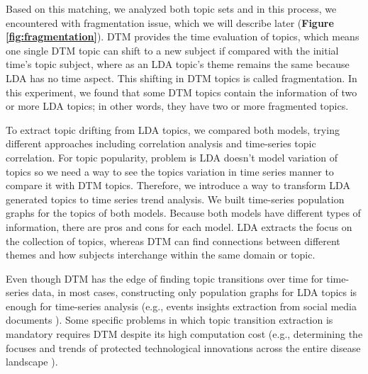 Based on this matching, we analyzed both topic sets and in this process, we encountered with fragmentation issue, which we will describe later (\textbf{Figure \ref{fig:fragmentation}}).
DTM provides the time evaluation of topics, which means one single DTM topic can shift to a new subject if compared with the initial time's topic subject, where as an LDA topic's theme remains the same because LDA has no time aspect. This shifting in DTM topics is called fragmentation. In this experiment, we found that some DTM topics contain the information of two or more LDA topics; in other words, they have two or more fragmented topics.

To extract topic drifting from LDA topics, we compared both models, trying different approaches including correlation analysis and time-series topic correlation. For topic popularity, problem is LDA doesn't model variation of topics so we need a way to see the topics variation in time series manner to compare it with DTM topics. Therefore, we introduce a way to transform LDA generated topics to time series trend analysis. We built time-series population graphs for the topics of both models. Because both models have different types of information, there are pros and cons for each model. LDA extracts the focus on the collection of topics, whereas DTM can find connections between different themes and how subjects interchange within the same domain or topic.

Even though DTM has the edge of finding topic transitions over time for time-series data, in most cases, constructing only population graphs for LDA topics is enough for time-series analysis (e.g., events insights extraction from social media documents \cite{khan2019events}).
Some specific problems in which topic transition extraction is mandatory requires DTM despite its high computation cost (e.g., determining the focuses and trends of protected technological innovations across the entire disease landscape \cite{huang2019technological}).
